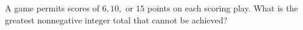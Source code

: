 A game permits scores of $6,10,$ or $15$ points on each scoring play. What is the greatest nonnegative integer total that cannot be achieved?
